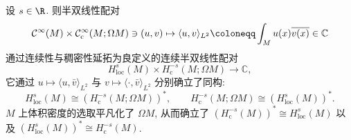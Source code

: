 \begin{theorem}[对偶性]\label{thm:5.63}
设 $s \in \R$. 则半双线性配对
\begin{equation}\label{eq:5.145}
    \Smooth(M) \times \SmoothComp(M; \Omega M) \ni (u, v) \mapsto \langle u, v \rangle_{L^2} \defeq \int_M u(x) \overline{v(x)} \in \mathbb{C}
\end{equation}
通过连续性与稠密性延拓为良定义的连续半双线性配对
\begin{equation}\label{eq:5.146}
    H_{\mathrm{loc}}^s(M) \times H_{\mathrm{c}}^{-s}(M; \Omega M) \to \mathbb{C},
\end{equation}
它通过 $u \mapsto \langle u, \bar{v} \rangle_{L^2}$ 与 $v \mapsto \langle \cdot, \bar{v} \rangle_{L^2}$ 分别确立了同构:
\[
    H_{\mathrm{loc}}^s(M) \cong \left( H_{\mathrm{c}}^{-s}(M; \Omega M) \right)^*, \qquad H_{\mathrm{c}}^{-s}(M; \Omega M) \cong \left( H_{\mathrm{loc}}^s(M) \right)^*.
\]
$M$ 上体积密度的选取平凡化了 $\Omega M$, 从而确立了 $(H_{\mathrm{c}}^{-s}(M))^* \cong H_{\mathrm{loc}}^s(M)$ 以及 $(H_{\mathrm{loc}}^s(M))^* \cong H_{\mathrm{c}}^{-s}(M)$.
\end{theorem}

